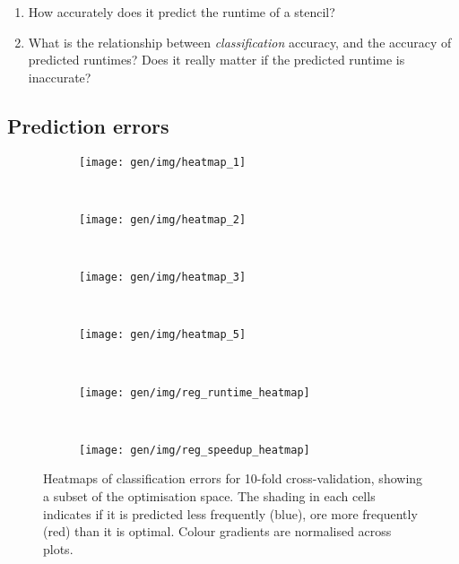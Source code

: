 

\begin{enumerate}
\item How accurately does it predict the runtime of a stencil?
\item What is the relationship between \emph{classification} accuracy,
  and the accuracy of predicted runtimes? Does it really matter if the
  predicted runtime is inaccurate?
\end{enumerate}


\subsection{Prediction errors}

\begin{figure}
\centering
\begin{subfigure}[t]{0.45\textwidth}
\centering
\texttt{[image: gen/img/heatmap\_1]}
\vspace{-1.5em} %
\caption{}
\label{fig:coverage}
\end{subfigure}
~%
\begin{subfigure}[t]{0.45\textwidth}
\centering
\texttt{[image: gen/img/heatmap\_2]}
\vspace{-1.5em} %
\caption{}
\label{fig:coverage}
\end{subfigure}
\\
\begin{subfigure}[t]{0.45\textwidth}
\centering
\texttt{[image: gen/img/heatmap\_3]}
\vspace{-1.5em} %
\caption{}
\label{fig:coverage}
\end{subfigure}
~%
\begin{subfigure}[t]{0.45\textwidth}
\centering
\texttt{[image: gen/img/heatmap\_5]}
\vspace{-1.5em} %
\caption{}
\label{fig:coverage}
\end{subfigure}
\\
\begin{subfigure}[t]{0.45\textwidth}
\centering
\texttt{[image: gen/img/reg\_runtime\_heatmap]}
\vspace{-1.5em} %
\caption{}
\label{fig:coverage}
\end{subfigure}
~%
\begin{subfigure}[t]{0.45\textwidth}
\centering
\texttt{[image: gen/img/reg\_speedup\_heatmap]}
\vspace{-1.5em} %
\caption{}
\label{fig:coverage}
\end{subfigure}
\caption{%
  Heatmaps of classification errors for 10-fold cross-validation,
  showing a subset of the optimisation space. The shading in each
  cells indicates if it is predicted less frequently (blue), ore more
  frequently (red) than it is optimal. Colour gradients are normalised
  across plots.%
}
\label{fig:class-hmaps}
\end{figure}


